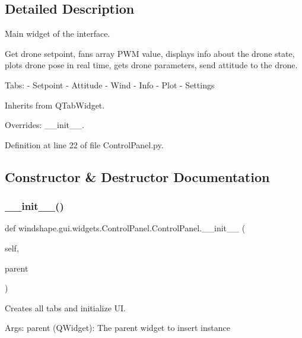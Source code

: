 \subsection{Detailed Description}
\begin{DoxyVerb}Main widget of the interface.

Get drone setpoint, fans array PWM value, displays info about the 
drone state, plots drone pose in real time, gets drone parameters,
send attitude to the drone.

Tabs:
    - Setpoint
    - Attitude
    - Wind
    - Info
    - Plot
    - Settings

Inherits from QTabWidget.

Overrides: __init__.
\end{DoxyVerb}
 

Definition at line 22 of file Control\+Panel.\+py.



\subsection{Constructor \& Destructor Documentation}
\mbox{\label{classwindshape_1_1gui_1_1widgets_1_1_control_panel_1_1_control_panel_aa35623692da665ef07969e15b98f158e}} 
\subsubsection{\texorpdfstring{\+\_\+\+\_\+init\+\_\+\+\_\+()}{\_\_init\_\_()}}
{\footnotesize\ttfamily def windshape.\+gui.\+widgets.\+Control\+Panel.\+Control\+Panel.\+\_\+\+\_\+init\+\_\+\+\_\+ (\begin{DoxyParamCaption}\item[{}]{self,  }\item[{}]{parent }\end{DoxyParamCaption})}

\begin{DoxyVerb}Creates all tabs and initialize UI.

Args:
    parent (QWidget): The parent widget to insert instance
\end{DoxyVerb}
 

